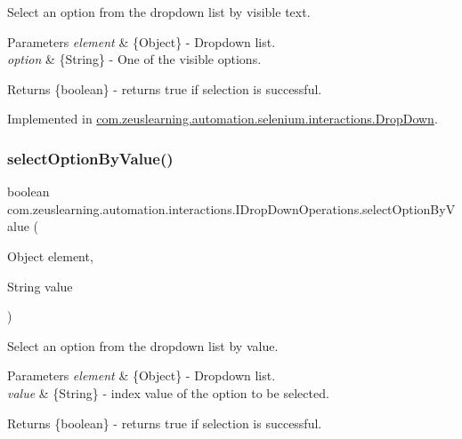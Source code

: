Select an option from the dropdown list by visible text.


\begin{DoxyParams}{Parameters}
{\em element} & \{Object\} -\/ Dropdown list. \\
\hline
{\em option} & \{String\} -\/ One of the visible options.\\
\hline
\end{DoxyParams}
\begin{DoxyReturn}{Returns}
\{boolean\} -\/ returns {\ttfamily true} if selection is successful. 
\end{DoxyReturn}


Implemented in \hyperlink{classcom_1_1zeuslearning_1_1automation_1_1selenium_1_1interactions_1_1DropDown_aa7c95fbe76e90d922c20459d6917e57e}{com.\+zeuslearning.\+automation.\+selenium.\+interactions.\+Drop\+Down}.

\hypertarget{interfacecom_1_1zeuslearning_1_1automation_1_1interactions_1_1IDropDownOperations_aa8d8cc39ebf833405a20ff1966d07b6b}{}\label{interfacecom_1_1zeuslearning_1_1automation_1_1interactions_1_1IDropDownOperations_aa8d8cc39ebf833405a20ff1966d07b6b} 
\subsubsection{\texorpdfstring{select\+Option\+By\+Value()}{selectOptionByValue()}}
{\footnotesize\ttfamily boolean com.\+zeuslearning.\+automation.\+interactions.\+I\+Drop\+Down\+Operations.\+select\+Option\+By\+Value (\begin{DoxyParamCaption}\item[{Object}]{element,  }\item[{String}]{value }\end{DoxyParamCaption})}

Select an option from the dropdown list by value.


\begin{DoxyParams}{Parameters}
{\em element} & \{Object\} -\/ Dropdown list. \\
\hline
{\em value} & \{String\} -\/ index value of the option to be selected.\\
\hline
\end{DoxyParams}
\begin{DoxyReturn}{Returns}
\{boolean\} -\/ returns {\ttfamily true} if selection is successful. 
\end{DoxyReturn}


